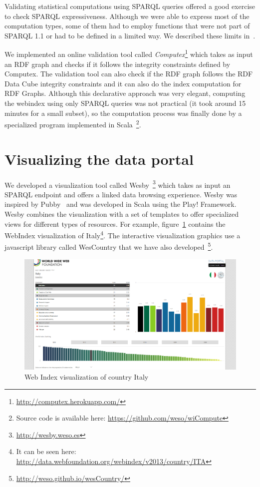 \documentclass{llncs}
\newcommand{\footnoteUrl}[1]{\footnote{\url{#1}}}
\begin{document}
Validating statistical computations using SPARQL queries offered 
 a good exercise to check SPARQL expressiveness. Although we were able 
 to express most of the computation types, some of them had to employ functions
 that were not part of SPARQL 1.1 or had to be defined in a limited way. We described these limits in~\cite{Labra13}.

We implemented an online validation tool called \emph{Computex}\footnote{\url{http://computex.herokuapp.com/}} which takes as
 input an RDF graph and checks if it follows the integrity constraints defined by Computex.
 The validation tool can also check if the RDF graph follows the RDF Data Cube integrity constraints
 and it can also do the index computation for RDF Graphs. 
 Although this declarative approach was very elegant, computing the webindex using only SPARQL queries
 was not practical (it took around 15 minutes for a small subset), so the computation process was finally done
 by a specialized program implemented in Scala~\footnote{Source code is available here: \url{https://github.com/weso/wiCompute}}. 
  
\section{Visualizing the data portal}

We developed a visualization tool called Wesby~\footnote{\url{http://wesby.weso.es}} which takes as input an SPARQL endpoint and offers a linked data browsing experience. Wesby was inspired by Pubby~\cite{Pubby} and was developed in Scala using the Play! Framework. 
Wesby combines the visualization with a set of templates to offer specialized views for different types of resources. For example, figure~\ref{Fig:WebIndexItaly} contains the WebIndex visualization of 
 Italy\footnote{It can be seen here: \url{http://data.webfoundation.org/webindex/v2013/country/ITA}}. The interactive visualization graphics use a javascript library called WesCountry that we have also developed~\footnoteUrl{http://weso.github.io/wesCountry/}.

\begin{figure}[h]
\begin{center}
  \includegraphics[width=\textwidth]{WebIndexIta}
\end{center}
\caption{Web Index visualization of country Italy}
\label{Fig:WebIndexItaly}
\end{figure}
\end{document}
